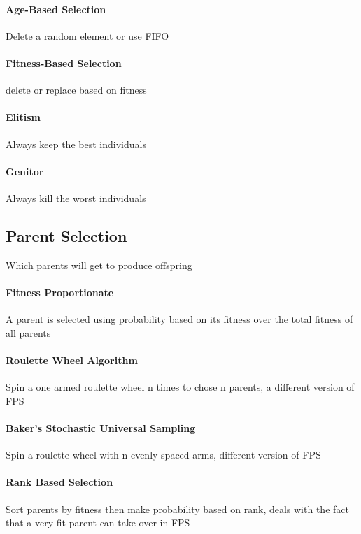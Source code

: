 \documentclass[12pt]{article}
\begin{document}
\paragraph{Age-Based Selection} 
Delete a random element or use FIFO

\paragraph{Fitness-Based Selection} 
delete or replace based on fitness

\paragraph{Elitism} 
Always keep the best individuals

\paragraph{Genitor} 
Always kill the worst individuals

\subsection*{Parent Selection}
Which parents will get to produce offspring

\paragraph{Fitness Proportionate} 
A parent is selected using probability based on its fitness over the total fitness of all parents

\paragraph{Roulette Wheel Algorithm} 
Spin a one armed roulette wheel n times to chose n parents, a different version of FPS

\paragraph{Baker's Stochastic Universal Sampling} 
Spin a roulette wheel with n evenly spaced arms, different version of FPS

\paragraph{Rank Based Selection} 
Sort parents by fitness then make probability based on rank, deals with the fact that a very fit parent can take over in FPS
\end{document}
